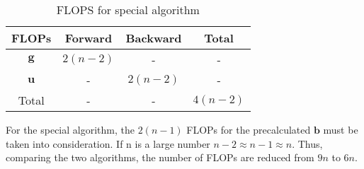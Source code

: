 \documentclass[%
oneside,                 %
final,                   %
10pt]{article}
\begin{document}
\begin{table}[ht]
\caption{FLOPS for special algorithm}
\centering
	\begin{tabular}{c c c c}
		\hline
		FLOPs   & Forward & Backward & Total \\ [0.5ex]
		\hline
		$\mathbf{g}$ & $2 (n-2)$       & -        & -    \\
        	$\mathbf{u}$ & -       & $2 (n-2)$        & -     \\
        	Total        & -       & -        & $4 (n-2)$      \\ [1ex]
		\hline
	\end{tabular}
\end{table}	
For the special algorithm, the $2(n-1)$ FLOPs for the precalculated $\mathbf{b}$ must be taken into consideration. If n is a large number $n-2 \approx n-1 \approx n$. Thus, comparing the two algorithms, the number of FLOPs are reduced from $9n$ to $6n$.
\end{document}
